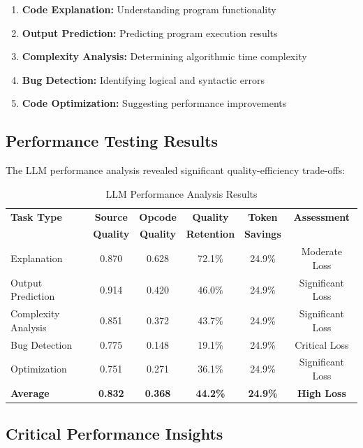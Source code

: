 \documentclass[11pt,a4paper]{article}
\begin{document}
\begin{enumerate}
    \item \textbf{Code Explanation:} Understanding program functionality
    \item \textbf{Output Prediction:} Predicting program execution results
    \item \textbf{Complexity Analysis:} Determining algorithmic time complexity
    \item \textbf{Bug Detection:} Identifying logical and syntactic errors
    \item \textbf{Code Optimization:} Suggesting performance improvements
\end{enumerate}

\subsection{Performance Testing Results}
The LLM performance analysis revealed significant quality-efficiency trade-offs:

\begin{table}[H]
\centering
\caption{LLM Performance Analysis Results}
\begin{tabular}{lccccc}
\toprule
\textbf{Task Type} & \textbf{Source} & \textbf{Opcode} & \textbf{Quality} & \textbf{Token} & \textbf{Assessment}\\
& \textbf{Quality} & \textbf{Quality} & \textbf{Retention} & \textbf{Savings} & \\
\midrule
Explanation & 0.870 & 0.628 & 72.1\% & 24.9\% & Moderate Loss\\
Output Prediction & 0.914 & 0.420 & 46.0\% & 24.9\% & Significant Loss\\
Complexity Analysis & 0.851 & 0.372 & 43.7\% & 24.9\% & Significant Loss\\
Bug Detection & 0.775 & 0.148 & 19.1\% & 24.9\% & Critical Loss\\
Optimization & 0.751 & 0.271 & 36.1\% & 24.9\% & Significant Loss\\
\midrule
\textbf{Average} & \textbf{0.832} & \textbf{0.368} & \textbf{44.2\%} & \textbf{24.9\%} & \textbf{High Loss}\\
\bottomrule
\end{tabular}
\end{table}

\subsection{Critical Performance Insights}
\end{document}
